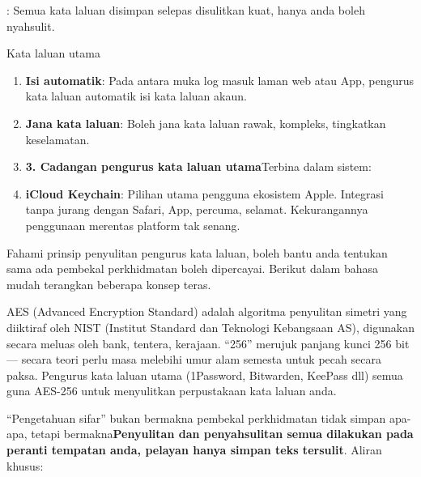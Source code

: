


: Semua kata laluan disimpan selepas disulitkan kuat, hanya anda boleh nyahsulit.

Kata laluan utama


\begin{enumerate}
  \item \textbf{Isi automatik}: Pada antara muka log masuk laman web atau App, pengurus kata laluan automatik isi kata laluan akaun.
  \item \textbf{Jana kata laluan}: Boleh jana kata laluan rawak, kompleks, tingkatkan keselamatan.
  \item \textbf{3. Cadangan pengurus kata laluan utama}Terbina dalam sistem:
  \item \textbf{iCloud Keychain}: Pilihan utama pengguna ekosistem Apple. Integrasi tanpa jurang dengan Safari, App, percuma, selamat. Kekurangannya penggunaan merentas platform tak senang.
\end{enumerate}


Fahami prinsip penyulitan pengurus kata laluan, boleh bantu anda tentukan sama ada pembekal perkhidmatan boleh dipercayai. Berikut dalam bahasa mudah terangkan beberapa konsep teras.


AES (Advanced Encryption Standard) adalah algoritma penyulitan simetri yang diiktiraf oleh NIST (Institut Standard dan Teknologi Kebangsaan AS), digunakan secara meluas oleh bank, tentera, kerajaan. “256” merujuk panjang kunci 256 bit — secara teori perlu masa melebihi umur alam semesta untuk pecah secara paksa. Pengurus kata laluan utama (1Password, Bitwarden, KeePass dll) semua guna AES-256 untuk menyulitkan perpustakaan kata laluan anda.


“Pengetahuan sifar” bukan bermakna pembekal perkhidmatan tidak simpan apa-apa, tetapi bermakna\textbf{Penyulitan dan penyahsulitan semua dilakukan pada peranti tempatan anda, pelayan hanya simpan teks tersulit}. Aliran khusus:

